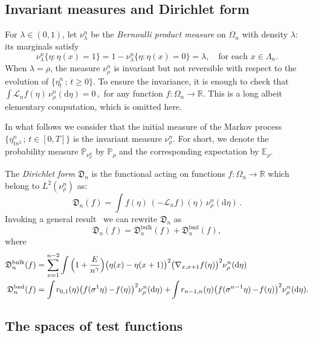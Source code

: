 \documentclass[10pt]{amsart}
\theoremstyle{definition}\newtheorem{defi}[theo]{Definition}\newtheorem{rema}[theo]{Remark}\newtheorem{exam}[theo]{Example}\newtheorem{exem}[theo]{Example}\newtheorem{nota}[theo]{Notation}
\DeclareMathOperator{\bulk}{bulk}
\DeclareMathOperator{\bnd}{bnd}
\newcommand{\bb}[1]{{\mathbb #1}}
\newcommand{\mc}[1]{{\mathcal #1}}
\newcommand{\mf}[1]{{\mathfrak #1}}
\renewcommand{\mc}[1]{{\mathcal #1}}
\renewcommand{\geq}{\geqslant}
\newcommand*{\dd}{\mathrm{d}}
\newcommand*{\mk}{\mkern -1mu}
\newcommand*{\Mk}{\mkern -2mu}
\begin{document}
\subsection{Invariant measures and Dirichlet form}

For $\lambda \in (0,1)$, let $\nu^n_\lambda$ be the \emph{Bernoulli product measure} on $\Omega_n$ with density $\lambda$: its marginals satisfy
\[
\nu^n_\lambda\big\{\eta: \eta(x)=1\big\} = 1-\nu^n_\lambda\big\{\eta:\eta(x)=0\big\} =\lambda, \quad \text {for each } x\in \Lambda_n.
\]
When $\lambda=\rho$, the measure $\nu^n_\rho$ is invariant but not reversible with respect to the evolution of $\{\eta_t^n\,; \,t \geq 0\}$. To ensure the invariance, it is enough to check that $
\int \mathcal L_n f(\eta)\, \nu^n_\rho(\dd\eta) =0\,,$ for any function $f:\Omega_n\to \bb R$. This is a long albeit elementary computation, which is omitted here.

In what follows we consider that the initial measure of the Markov process $\{\eta^n_{tn^2}\,; \, t\in [0,T]\}$ is the invariant measure $\nu^n_\rho$. For short, we denote the probability measure $\bb P_{\nu^n_\rho}$ by $\bb P_\rho$ and the corresponding expectation by $\bb E_\rho$.


The \emph{Dirichlet form} $\mf D_n$ is the functional acting on functions $f:\Omega_n\to \bb R$ which belong to $L^2(\nu^n_\rho)$ as:
\begin{equation}\label{eq:dir_form}
\mf D_n(f) =\int f(\eta)\,(-\mc L_nf)(\eta)\, \nu^n_\rho(\dd\eta)\,.
\end{equation}
Invoking a general result~\cite[Appendix~1, Proposition~10.1]{kl} we can rewrite $\mf D_n$ as
\begin{equation}
\mf D_n (f)=\mf D_n^{\bulk} (f)+\mf D_n^{{\bnd}} (f),\label{eq:direxpl}
\end{equation}
where
\begin{align*}
\mf D_n^{\bulk} (f)&=\sum_{x=1}^{n-2}\int \Big(1+\frac{E}{n^\gamma} \Big){\big(\eta(x)-\eta(x+1)\big)^2}\big(\nabla_{x,x+1} f(\eta)\big)^2\nu^n_\rho(\dd\eta)\\
\mf D_n^{\bnd} (f)&=
\int\mk r_{0,1}(\eta)\big(f(\sigma^{1}\eta) \mk-\!f(\eta)\big)^2\nu^n_\rho(\dd\eta) +\Mk
\int\mk r_{n-1,n}(\eta)\big(f(\sigma^{n-1}\eta) \mk-\!f(\eta)\big)^2\nu^n_\rho(\dd\eta).
\end{align*}


\subsection{The spaces of test functions}\label{ssec:test_functions}
\end{document}
